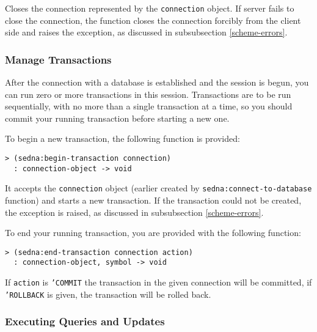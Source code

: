 \documentclass[a4paper,12pt]{article}
\begin{document}
Closes the connection represented by the \texttt{connection} object. If server
fails to close the connection, the function closes the connection forcibly from
the client side and raises the exception, as discussed in subsubsection
\ref{scheme-errors}.


\subsubsection{Manage Transactions}

After the connection with a database is established and the session is begun,
you can run zero or more transactions in this session. Transactions are to be
run sequentially, with no more than a single transaction at a time, so you
should commit your running transaction before starting a new one.

To begin a new transaction, the following function is provided:

\begin{verbatim}
> (sedna:begin-transaction connection)
  : connection-object -> void
\end{verbatim}

It accepts the \texttt{connection} object (earlier created by
\texttt{sedna:connect-to-database} function) and starts a new transaction. If
the transaction could not be created, the exception is raised, as discussed in
subsubsection \ref{scheme-errors}.

To end your running transaction, you are provided with the following function:

\begin{verbatim}
> (sedna:end-transaction connection action)
  : connection-object, symbol -> void
\end{verbatim}

If \texttt{action} is \texttt{'COMMIT} the transaction in the given connection
will be committed, if \texttt{'ROLLBACK} is given, the transaction will be rolled
back.


\subsubsection{Executing Queries and Updates}
\end{document}

